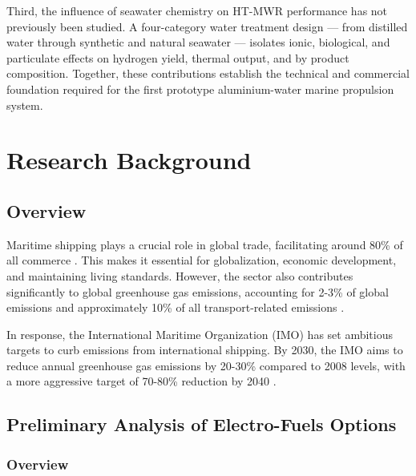 \documentclass[12pt]{article}
\begin{document}
Third, the influence of seawater chemistry on HT-MWR performance has not previously been studied. A four-category water treatment design — from distilled water through synthetic and natural seawater — isolates ionic, biological, and particulate effects on hydrogen yield, thermal output, and by product composition. Together, these contributions establish the technical and commercial foundation required for the first prototype aluminium-water marine propulsion system. 

\break

\tableofcontents

\break

\listoftables

\listoffigures

\break

\section{Research Background}

\subsection*{Overview}

Maritime shipping plays a crucial role in global trade, facilitating around 80\% of all commerce \cite{owid-co2-emissions-from-transport}. This makes it essential for globalization, economic development, and maintaining living standards. However, the sector also contributes significantly to global greenhouse gas emissions, accounting for 2-3\% of global emissions and approximately 10\% of all transport-related emissions \cite{owid-ghg-emissions-by-sector, owid-co2-emissions-from-transport}.

In response, the International Maritime Organization (IMO) has set ambitious targets to curb emissions from international shipping. By 2030, the IMO aims to reduce annual greenhouse gas emissions by 20-30\% compared to 2008 levels, with a more aggressive target of 70-80\% reduction by 2040 \cite{imo-target}.

\subsection{Preliminary Analysis of Electro-Fuels Options}

\subsubsection*{Overview}
\end{document}
